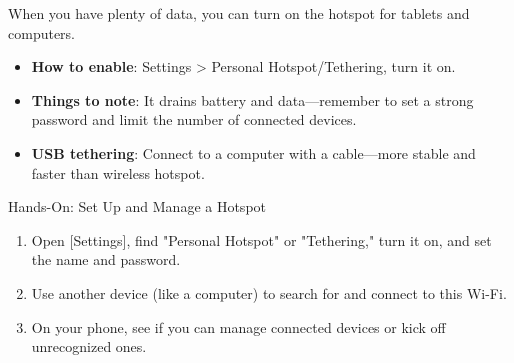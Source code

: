 
When you have plenty of data, you can turn on the hotspot for tablets and computers.

\begin{itemize}
  \item \textbf{How to enable}: Settings > Personal Hotspot/Tethering, turn it on.
  \item \textbf{Things to note}: It drains battery and data—remember to set a strong password and limit the number of connected devices.
  \item \textbf{USB tethering}: Connect to a computer with a cable—more stable and faster than wireless hotspot.
\end{itemize}

\begin{tcbpractice}{Hands-On: Set Up and Manage a Hotspot}
\begin{enumerate}
  \item Open [Settings], find "Personal Hotspot" or "Tethering," turn it on, and set the name and password.
  \item Use another device (like a computer) to search for and connect to this Wi-Fi.
  \item On your phone, see if you can manage connected devices or kick off unrecognized ones.
\end{enumerate}

\end{tcbpractice}
